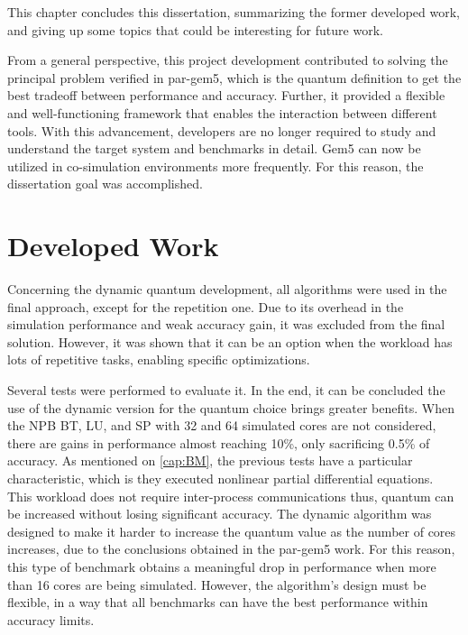 

This chapter concludes this dissertation, summarizing the former developed work, and giving up some topics that could be
interesting for future work.

From a general perspective, this project development contributed to solving the principal problem verified in par-gem5, which is the 
quantum definition to get the best tradeoff between performance and accuracy. Further, it provided a flexible and well-functioning framework 
that enables the interaction between different tools. With this advancement, developers are no longer required to study and understand 
the target system and benchmarks in detail. Gem5 can now be utilized in co-simulation environments more frequently.
For this reason, the dissertation goal was accomplished. 

\section{Developed Work}

Concerning the dynamic quantum development, all algorithms were used in the final approach, except for the repetition one. Due to its overhead in the 
simulation performance and weak accuracy gain, it was excluded from the final solution. However, it was shown 
that it can be an option when the workload has lots of repetitive tasks, enabling specific optimizations.

Several tests were performed to evaluate it. In the end, it can be concluded the use of the dynamic version for the quantum choice brings 
greater benefits. When the NPB BT, LU, and SP with 32 and 64 simulated cores are not considered, there are gains in performance almost 
reaching 10\%, only sacrificing 0.5\% of accuracy. As mentioned on \autoref{cap:BM}, the previous tests have a particular characteristic, 
which is they executed nonlinear partial differential equations. This workload does not require inter-process communications thus, 
quantum can be increased without losing significant accuracy. The dynamic algorithm was designed to make it harder to increase the 
quantum value as the number of cores increases, due to the conclusions obtained in the par-gem5 \cite*{pargem5} work. For this reason, 
this type of benchmark obtains a meaningful drop in performance when more than 16 cores are being simulated. However, the 
algorithm's design must be flexible, in a way that all benchmarks can have the best performance within accuracy limits.

